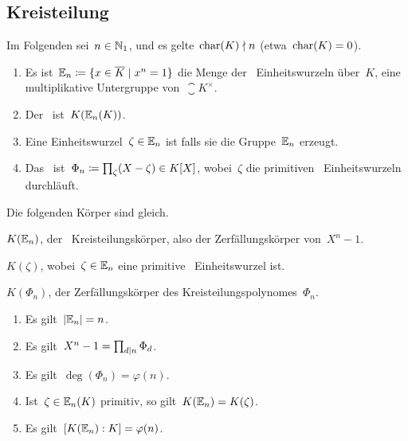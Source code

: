 \subsection{Kreisteilung}

\begin{convention}
  Im Folgenden sei~$n \in \mathbb{N}_1$, und es gelte~$\operatorname{char}(K) \nmid n$ (etwa~$\operatorname{char}(K) = 0$).
\end{convention}

\begin{definition}
  \leavevmode
  \begin{enumerate}
    \item
      Es ist~$\Ein_n \defined \{ x \in \closure{K} \suchthat x^n = 1 \}$ die Menge der~ Einheitswurzeln über~$K$, eine multiplikative Untergruppe von~$\closure{K}^\times$.
    \item
      Der~  ist~$K(\operatorname{\mathbb{E}}_n(K))$.
    \item
      Eine Einheitswurzel~$\zeta \in \operatorname{\mathbb{E}}_n$ ist  falls sie die Gruppe~$\operatorname{\mathbb{E}}_n$ erzeugt.
    \item
      Das~  ist~$\Phi_n \coloneqq \prod_{\zeta} (X - \zeta) \in K[X]$, wobei~$\zeta$ die primitiven~ Einheitswurzeln durchläuft.
  \end{enumerate}
\end{definition}

\begin{proposition}
  Die folgenden Körper sind gleich.
  \begin{equivlist}
    \item
      $K( \operatorname{\mathbb{E}}_n )$, der~ Kreisteilungskörper, also der Zerfällungskörper von~$X^n - 1$.
    \item
      $K( \zeta )$, wobei~$\zeta \in \operatorname{\mathbb{E}}_n$ eine primitive~ Einheitswurzel ist.
    \item
      $K( \Phi_n )$, der Zerfällungskörper des Kreisteilungspolynomes~$\Phi_n$.
  \end{equivlist}
\end{proposition}

\begin{proposition}
  \leavevmode
  \begin{enumerate}
    \item
      Es gilt~$\lvert \operatorname{\mathbb{E}}_n \rvert = n$.
    \item
      Es gilt~$X^n - 1 = \prod_{d \mid n} \Phi_d$.
    \item
      Es gilt~$\deg( \Phi_n ) = \varphi(n)$.
    \item
      Ist~$\zeta \in \operatorname{\mathbb{E}}_n(K)$ primitiv, so gilt~$K( \operatorname{\mathbb{E}}_n ) = K( \zeta )$.
    \item
      Es gilt~$[ K(\operatorname{\mathbb{E}}_n) : K ] = \varphi(n)$.
  \end{enumerate}
\end{proposition}

